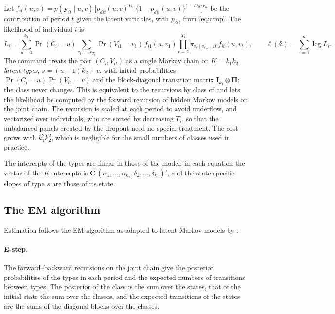 \documentclass[11pt,a4paper]{article}
\newcommand{\yv}{\mathbf y}
\begin{document}
Let $f_{it}(u,v)=p(\yv_{it}\mid u,v)\,\big[p_{dit}(u,v)^{D_{it}}\{1-p_{dit}(u,v)\}^{1-D_{it}}\big]^{r_{it}}$
be the contribution of period $t$ given the latent variables, with $p_{dit}$ from \eqref{eq:drop}. The
likelihood of individual $i$ is
\begin{equation}
L_i=\sum_{u=1}^{k_1}\Pr(C_i=u)\sum_{v_1,\dots,v_{T_i}}\Pr(V_{i1}=v_1)\,f_{i1}(u,v_1)
\prod_{t=2}^{T_i}\pi_{v_t\mid v_{t-1},it}\,f_{it}(u,v_t),
\qquad\ell(\bm\vartheta)=\sum_{i=1}^n\log L_i.
\end{equation}
The command treats the pair $(C_i,V_{it})$ as a single Markov chain on $K=k_1k_2$ \emph{latent types},
$s=(u-1)k_2+v$, with initial probabilities $\Pr(C_i=u)\Pr(V_{i1}=v)$ and the block-diagonal transition
matrix $\mathbf I_{k_1}\otimes\bm\Pi$: the class never changes. This is equivalent to the recursions by
class of \citet{carrieri2026} and lets the likelihood be computed by the forward recursion of hidden
Markov models \citep{baum1970,zucchini2016} on the joint chain. The recursion is scaled at each period to
avoid underflow, and vectorized over individuals, who are sorted by decreasing $T_i$, so that the
unbalanced panels created by the dropout need no special treatment. The cost grows with $k_1^2k_2^2$,
which is negligible for the small numbers of classes used in practice.

The intercepts of the types are linear in those of the model: in each equation the vector of the $K$
intercepts is $\mathbf C\,(\alpha_1,\dots,\alpha_{k_2},\delta_2,\dots,\delta_{k_1})'$, and the
state-specific slopes of type $s$ are those of its state.

\subsection{The EM algorithm}\label{sec:em}

Estimation follows the EM algorithm \citep{dempster1977} as adapted to latent Markov models by
\citet{bartolucci2013}.

\paragraph{E-step.} The forward--backward recursions on the joint chain give the posterior probabilities
of the types in each period and the expected numbers of transitions between types. The posterior of the
class is the sum over the states, that of the initial state the sum over the classes, and the expected
transitions of the states are the sums of the diagonal blocks over the classes.
\end{document}
